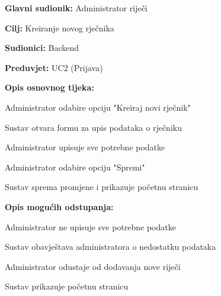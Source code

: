 					\noindent {}
					\begin{packed_item}
						
						\item \textbf{Glavni sudionik: } Administrator riječi
						\item  \textbf{Cilj:} Kreiranje novog rječnika
						\item  \textbf{Sudionici:} Backend
						\item  \textbf{Preduvjet:} UC2 (Prijava)
						\item  \textbf{Opis osnovnog tijeka:}
						
						\item[] \begin{packed_enum}
							
							\item Administrator odabire opciju "Kreiraj novi rječnik"
							\item Sustav otvara formu za upis podataka o rječniku 
							\item Administrator upisuje sve potrebne podatke
							\item Administrator odabire opciju "Spremi"
							\item Sustav sprema promjene i prikazuje početnu stranicu
						
						\end{packed_enum}
					
						\item  \textbf{Opis mogućih odstupanja:}
					
						\item[] \begin{packed_item}
						
							\item[3.a] Administrator ne upisuje sve potrebne podatke 
							\item[] \begin{packed_enum}
								
								\item Sustav obavještava administratora o nedostatku podataka 
								
							\end{packed_enum}	
							
							\item[4.a] Administrator odustaje od dodavanja nove riječi
							\item[] \begin{packed_enum}
								
								\item Sustav prikazuje početnu stranicu
								
							\end{packed_enum}
								\end{packed_item}
						\end{packed_item}
					
